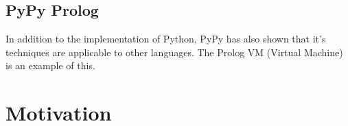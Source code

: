 \subsection{PyPy Prolog}

In addition to the implementation of Python, PyPy has also shown that it's techniques
are applicable to other languages. The Prolog VM (Virtual Machine) is an example of this.


\cite{bolz2010towards}


\section{Motivation}




